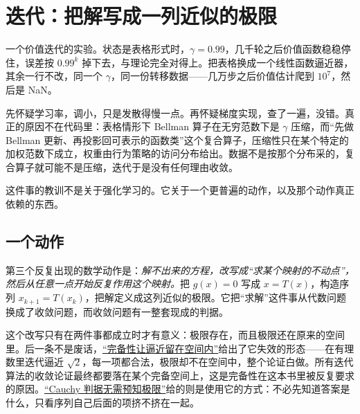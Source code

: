 \section{迭代：把解写成一列近似的极限}
\label{sec:18-Synthesis/02-Recurring-Ideas/03}

一个价值迭代的实验。状态是表格形式时，\(\gamma=0.99\)，几千轮之后价值函数稳稳停住，误差按 \(0.99^{k}\) 掉下去，与理论完全对得上。把表格换成一个线性函数逼近器，其余一行不改，同一个 \(\gamma\)，同一份转移数据——几万步之后价值估计爬到 \(10^{7}\)，然后是 NaN。

先怀疑学习率，调小，只是发散得慢一点。再怀疑梯度实现，查了一遍，没错。真正的原因不在代码里：表格情形下 Bellman 算子在无穷范数下是 \(\gamma\) 压缩，而``先做 Bellman 更新、再投影回可表示的函数类''这个复合算子，压缩性只在某个特定的加权范数下成立，权重由行为策略的访问分布给出。数据不是按那个分布采的，复合算子就可能不是压缩，迭代于是没有任何理由收敛。

这件事的教训不是关于强化学习的。它关于一个更普遍的动作，以及那个动作真正依赖的东西。

\subsection{一个动作}

第三个反复出现的数学动作是：\emph{解不出来的方程，改写成``求某个映射的不动点''，然后从任意一点开始反复作用这个映射。}把 \(g(x)=0\) 写成 \(x = T(x)\)，构造序列 \(x_{k+1}=T(x_k)\)，把解定义成这列近似的极限。它把``求解''这件事从代数问题换成了收敛问题，而收敛问题有一整套现成的判据。

这个改写只有在两件事都成立时才有意义：极限存在，而且极限还在原来的空间里。后一条不是废话，\hyperref[sec:12-Real-Analysis-Support/03-Topology-Basics/03]{``完备性让逼近留在空间内''}给出了它失效的形态——在有理数里迭代逼近 \(\sqrt2\)，每一项都合法，极限却不在空间中，整个论证白做。所有迭代算法的收敛论证最终都要落在某个完备空间上，这是完备性在这本书里被反复要求的原因。\hyperref[sec:12-Real-Analysis-Support/01-Real-Numbers-and-Completeness/02]{``Cauchy 判据无需预知极限''}给的则是使用它的方式：不必先知道答案是什么，只看序列自己后面的项挤不挤在一起。

